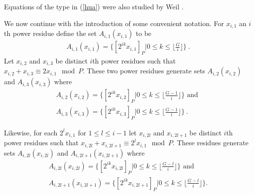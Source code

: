 Equations of the type in (\ref{hua}) were also studied by Weil
\cite{weil:49}.




We now continue with the introduction of some convenient notation.
For $x_{i,1}$ an $i$th power residue define the set
$A_{i,1}(x_{i,1})$ to be
\begin{eqnarray}\label{azi1}A_{i,1}(x_{i,1})=\{[2^{ik}x_{i,1}]_P | 0 \leq k \leq
\lfloor\frac{G}{i} \rfloor \}~.\end{eqnarray} Let $x_{i,2}$ and
$x_{i,3}$ be distinct $i$th power residues such that
$x_{i,2}+x_{i,3} \equiv 2x_{i,1} \mod P$. %
These two power residues generate sets $A_{i,2}(x_{i,2})$ and
$A_{i,3}(x_{i,3})$ where
\begin{eqnarray}\label{azi2} A_{i,2}(x_{i,2}) =\{ [2^{ik}x_{i,2}]_P| 0 \leq k \leq \lfloor
\frac{G-1}{i} \rfloor \} \text{ and }\\
\label{azi3}A_{i,3}(x_{i,3}) =\{ [2^{ik}x_{i,3}]_P| 0 \leq k \leq
\lfloor \frac{G-1}{i} \rfloor \}~.\end{eqnarray}

Likewise, for each $2^lx_{i,1}$ for $1 \leq l \leq i-1$ let
$x_{i,2l}$ and $x_{i,2l+1}$ be distinct $i$th power residues such
that
$x_{i,2l} + x_{i,2l+1} \equiv 2^lx_{i,1} \mod P$. %
These residues generate sets $A_{i,2l}(x_{i,2l})$ and
$A_{i,2l+1}(x_{i,2l+1})$ where
\begin{eqnarray}\label{azi2l}
A_{i,2l}(x_{i,2l}) =\{ [2^{ik}x_{i,2l}]_P| 0 \leq k \leq \lfloor
\frac{G-l}{i} \rfloor \} \text{ and }\\
\label{azi2la}A_{i,2l+1}(x_{i,2l+1}) =\{ [2^{ik}x_{i,2l+1}]_P| 0
\leq k \leq \lfloor \frac{G-l}{i} \rfloor \}.\end{eqnarray}

